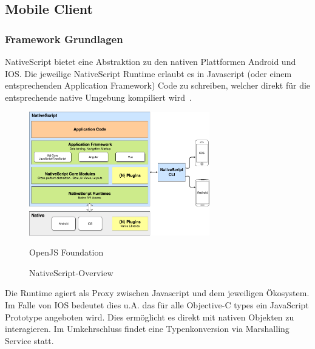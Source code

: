 \subsection{Mobile Client}\label{subsec:mobile-client}

\subsubsection{Framework Grundlagen}
NativeScript bietet eine Abstraktion zu den nativen Plattformen Android und IOS.
Die jeweilige NativeScript Runtime erlaubt es in Javascript (oder einem entsprechenden Application Framework) Code zu schreiben,
welcher direkt für die entsprechende native Umgebung kompiliert wird~\cite{ns-core-overview}.
\begin{figure}[h]
    \centering
    \label{fig:howNSWorks}
    \includegraphics[width=0.7\textwidth]{graphics/ns-common}\caption[NativeScript-Overview]{NativeScript-Overview}\textcopyright OpenJS Foundation
\end{figure}


Die Runtime agiert als Proxy zwischen Javascript und dem jeweiligen Ökosystem.
Im Falle von IOS bedeutet dies u.A. das für alle Objective-C types ein JavaScript Prototype angeboten wird.
Dies ermöglicht es direkt mit nativen Objekten zu interagieren.
Im Umkehrschluss findet eine Typenkonversion via Marshalling Service statt\cite{ns-ios-runtime}.




